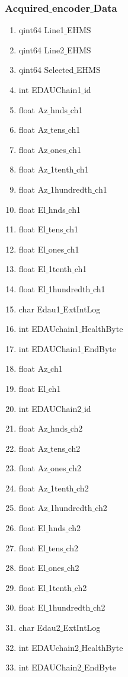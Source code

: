 \begin{enumerate}
\subsubsection{Acquired$\_$encoder$\_$Data}
\begin{enumerate}
	\item qint64 Line1$\_$EHMS
	\item qint64 Line2$\_$EHMS
	\item qint64 Selected$\_$EHMS
	\item int EDAUChain1$\_$id
	\item float Az$\_$hnds$\_$ch1
	\item float Az$\_$tens$\_$ch1
	\item float Az$\_$ones$\_$ch1
	\item float Az$\_$1tenth$\_$ch1
	\item float Az$\_$1hundredth$\_$ch1
	\item float El$\_$hnds$\_$ch1
	\item float El$\_$tens$\_$ch1
	\item float El$\_$ones$\_$ch1
	\item float El$\_$1tenth$\_$ch1
	\item float El$\_$1hundredth$\_$ch1
	\item char Edau1$\_$ExtIntLog
	\item int EDAUchain1$\_$HealthByte
	\item int EDAUChain1$\_$EndByte
	\item float Az$\_$ch1
	\item float El$\_$ch1
	\item int EDAUChain2$\_$id
	\item float Az$\_$hnds$\_$ch2
	\item float Az$\_$tens$\_$ch2
	\item float Az$\_$ones$\_$ch2
	\item float Az$\_$1tenth$\_$ch2
	\item float Az$\_$1hundredth$\_$ch2
	\item float El$\_$hnds$\_$ch2
	\item float El$\_$tens$\_$ch2
	\item float El$\_$ones$\_$ch2
	\item float El$\_$1tenth$\_$ch2
	\item float El$\_$1hundredth$\_$ch2
	\item char Edau2$\_$ExtIntLog
	\item int EDAUchain2$\_$HealthByte
	\item int EDAUChain2$\_$EndByte

\end{enumerate}
\end{enumerate}
